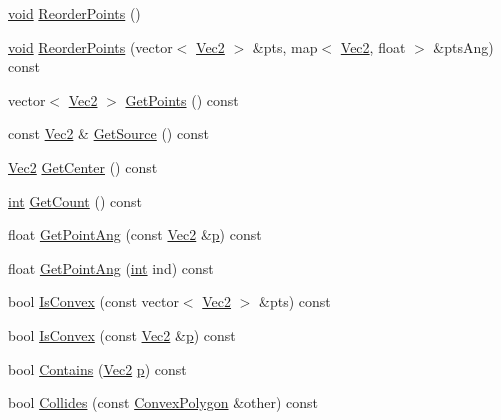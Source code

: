 \begin{DoxyCompactItemize}
\item 
\hyperlink{_s_d_l__opengles2__gl2ext_8h_ae5d8fa23ad07c48bb609509eae494c95}{void} \hyperlink{class_convex_polygon_a266f210b750066c5ee7dc4b4496aafad}{Reorder\-Points} ()
\item 
\hyperlink{_s_d_l__opengles2__gl2ext_8h_ae5d8fa23ad07c48bb609509eae494c95}{void} \hyperlink{class_convex_polygon_aba8a04d4c9431553cb293eb88dac8e75}{Reorder\-Points} (vector$<$ \hyperlink{class_vec2}{Vec2} $>$ \&pts, map$<$ \hyperlink{class_vec2}{Vec2}, float $>$ \&pts\-Ang) const 
\item 
vector$<$ \hyperlink{class_vec2}{Vec2} $>$ \hyperlink{class_convex_polygon_a3e551cc3a2bd024cddc36e1d1e5562c9}{Get\-Points} () const 
\item 
const \hyperlink{class_vec2}{Vec2} \& \hyperlink{class_convex_polygon_a354e3d416869e31c787804e5cb3eebd5}{Get\-Source} () const 
\item 
\hyperlink{class_vec2}{Vec2} \hyperlink{class_convex_polygon_a0685517f2d6eb80742bf88ac1e2689ac}{Get\-Center} () const 
\item 
\hyperlink{_s_d_l__thread_8h_a6a64f9be4433e4de6e2f2f548cf3c08e}{int} \hyperlink{class_convex_polygon_a2a2606ce134f44f2bb1e19689e4558e3}{Get\-Count} () const 
\item 
float \hyperlink{class_convex_polygon_a9030e871de4670b275aa47b359db0190}{Get\-Point\-Ang} (const \hyperlink{class_vec2}{Vec2} \&\hyperlink{_s_d_l__opengl__glext_8h_aa5367c14d90f462230c2611b81b41d23}{p}) const 
\item 
float \hyperlink{class_convex_polygon_ad616a5ea3a79e3b2b4de1154c379c0b7}{Get\-Point\-Ang} (\hyperlink{_s_d_l__thread_8h_a6a64f9be4433e4de6e2f2f548cf3c08e}{int} ind) const 
\item 
bool \hyperlink{class_convex_polygon_a368dd38e647e1210cac1c6ad35a34496}{Is\-Convex} (const vector$<$ \hyperlink{class_vec2}{Vec2} $>$ \&pts) const 
\item 
bool \hyperlink{class_convex_polygon_a6785cd299b35d4fd7a75cee1b2859999}{Is\-Convex} (const \hyperlink{class_vec2}{Vec2} \&\hyperlink{_s_d_l__opengl__glext_8h_aa5367c14d90f462230c2611b81b41d23}{p}) const 
\item 
bool \hyperlink{class_convex_polygon_a061d5461a0535cf9e5acf5568ada85e2}{Contains} (\hyperlink{class_vec2}{Vec2} \hyperlink{_s_d_l__opengl__glext_8h_aa5367c14d90f462230c2611b81b41d23}{p}) const 
\item 
bool \hyperlink{class_convex_polygon_a04ebd48e095c0cae6a0f0be85d56d0ed}{Collides} (const \hyperlink{class_convex_polygon}{Convex\-Polygon} \&other) const 

\end{DoxyCompactItemize}
